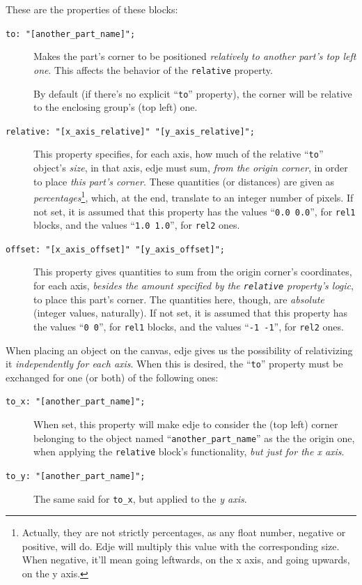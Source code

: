 \documentclass[a4paper]{profusion}
\begin{document}
These are the properties of these blocks:

\begin{description}
\item[\texttt{to: "[another\_part\_name]";}] Makes the part's corner
  to be positioned \emph{relatively to another part's top left
    one}. This affects the behavior of the \texttt{relative} property.

  By default (if there's no explicit ``\texttt{to}'' property), the
  corner will be relative to the enclosing group's (top left) one.

\item[\texttt{relative: "[x\_axis\_relative]" "[y\_axis\_relative]";}]
  This property specifies, for each axis, how much of the relative
  ``\texttt{to}'' object's \emph{size}, in that axis, edje must sum,
  \emph{from the origin corner}, in order to place \emph{this part's
    corner}. These quantities (or distances) are given as
  \emph{percentages}\footnote{Actually, they are not strictly
    percentages, as any float number, negative or positive, will
    do. Edje will multiply this value with the corresponding size.
    When negative, it'll mean going leftwards, on the x axis, and
    going upwards, on the y axis.}, which, at the end, translate to an
  integer number of pixels. If not set, it is assumed that this
  property has the values ``\texttt{0.0 0.0}'', for \texttt{rel1}
  blocks, and the values ``\texttt{1.0 1.0}'', for \texttt{rel2} ones.

\item[\texttt{offset: "[x\_axis\_offset]" "[y\_axis\_offset]";}] This
  property gives quantities to sum from the origin corner's
  coordinates, for each axis, \emph{besides the amount specified by
    the \texttt{relative} property's logic}, to place this part's
  corner.  The quantities here, though, are \emph{absolute} (integer
  values, naturally). If not set, it is assumed that this property has
  the values ``\texttt{0 0}'', for \texttt{rel1} blocks, and the
  values ``\texttt{-1 -1}'', for \texttt{rel2} ones.
\end{description}

When placing an object on the canvas, edje gives us the possibility of
relativizing it \emph{independently for each axis}. When this is
desired, the ``\texttt{to}'' property must be exchanged for one (or
both) of the following ones:

\begin{description}
\item[\texttt{to\_x: "[another\_part\_name]";}] When set, this
  property will make edje to consider the (top left) corner belonging
  to the object named ``\texttt{another\_part\_name}'' as the the
  origin one, when applying the \texttt{relative} block's
  functionality, \emph{but just for the x axis}.

\item[\texttt{to\_y: "[another\_part\_name]";}] The same said for
  \texttt{to\_x}, but applied to the \emph{y axis}.
\end{description}
\end{document}
